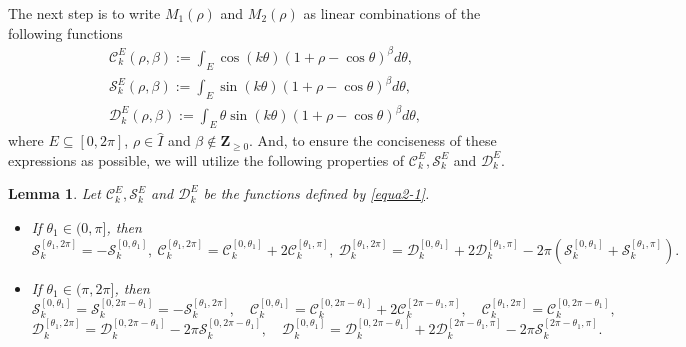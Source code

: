\documentclass[11pt]{amsart}
\newtheorem{lem}[thm]{Lemma}
\theoremstyle{remark}
\theoremstyle{definition}
\begin{document}
The next step  is to write $M_{1}(\rho)$ and $M_2(\rho)$ as   linear combinations  of the following functions
\begin{equation}\label{equa2-1}
\begin{split}
&\mathcal{C}_{k}^{E}(\rho,\beta):=\int_{E}\cos (k\theta)\left(1+\rho-\cos\theta\right)^{\beta}d\theta, \\ &\mathcal{S}_{k}^{E}(\rho,\beta):=\int_{E}\sin (k\theta)\left(1+\rho-\cos\theta\right)^{\beta}d\theta,
\\ &\mathcal{D}_{k}^{E}(\rho,\beta):=\int_{E}\theta\sin (k\theta)\left(1+\rho-\cos\theta\right)^{\beta}d\theta,
\end{split}
\end{equation}
where  $E\subseteq [0,2\pi]$, $\rho \in \hat{I}$ and  $\beta\notin \mathbf{Z}_{\geq 0}$.  And, to ensure the  conciseness  of these expressions as possible, we will utilize the following properties
 of $\mathcal{C}_{k}^{E}, \mathcal{S}_{k}^{E}$ and $\mathcal{D}_{k}^{E}$.

\begin{lem} \label{lemforSCD} Let  $\mathcal{C}_{k}^{E}, \mathcal{S}_{k}^{E}$ and $\mathcal{D}_{k}^{E}$ be the functions defined by  \eqref{equa2-1}.
\begin{itemize}

\item[(i)] If  $\theta_1\in(0,\pi]$, then \begin{equation*}
\label{relaofscd-1}\mathcal{S}_{k}^{\left[\theta_{1},2\pi\right]}
=-\mathcal{S}_{k}^{\left[0,\theta_{1}\right]},\
\mathcal{C}_{k}^{\left[\theta_{1},2\pi\right]}
=\mathcal{C}_{k}^{\left[0,\theta_{1}\right]}+2\mathcal{C}_{k}^{\left[\theta_{1},\pi\right]},\
\mathcal{D}_{k}^{\left[\theta_{1},2\pi\right]}
=\mathcal{D}_{k}^{\left[0,\theta_{1}\right]}+2\mathcal{D}_{k}^{\left[\theta_{1},\pi\right]}-2\pi\left(\mathcal{S}_{k}^{\left[0,\theta_{1}\right]}+\mathcal{S}_{k}^{\left[\theta_{1},\pi\right]}\right).\end{equation*}

\item[(ii)]  If $\theta_1\in(\pi, 2\pi]$, then
\begin{equation*}\label{relaofscd-2}
 \mathcal{S}_{k}^{\left[0,\theta_{1}\right]}=\mathcal{S}_{k}^{\left[0,2\pi-\theta_{1}\right]}=-\mathcal{S}_{k}^{\left[\theta_{1},2\pi\right]},\quad
\mathcal{C}_{k}^{\left[0,\theta_{1}\right]}
=\mathcal{C}_{k}^{\left[0,2\pi-\theta_{1}\right]}+2\mathcal{C}_{k}^{\left[2\pi-\theta_{1},\pi\right]},\quad
\mathcal{C}_{k}^{\left[\theta_{1},2\pi\right]}
=\mathcal{C}_{k}^{\left[0,2\pi-\theta_1\right]},
\end{equation*}
\begin{equation*}\label{relaofscd-2-1}
 \mathcal{D}_{k}^{\left[\theta_{1},2\pi\right]}=\mathcal{D}_{k}^{\left[0, 2\pi-\theta_{1}\right]}-2\pi\mathcal{S}_{k}^{\left[0, 2\pi-\theta_{1}\right]},\quad
 \mathcal{D}_{k}^{\left[0, \theta_{1}\right]}=\mathcal{D}_{k}^{\left[0, 2\pi-\theta_{1}\right]}+2\mathcal{D}_{k}^{\left[ 2\pi-\theta_{1}, \pi\right]}-2\pi\mathcal{S}_{k}^{\left[ 2\pi-\theta_{1}, \pi\right]}.
\end{equation*}
\end{itemize}
\end{lem}
\end{document}
